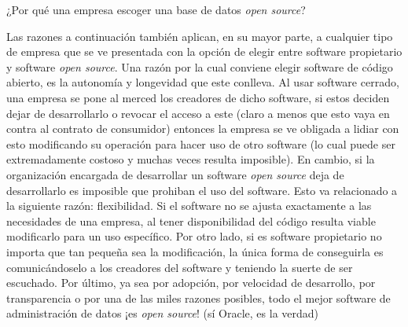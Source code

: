 \item ¿Por qué una empresa escoger una base de datos \textit{open source}?

  Las razones a continuación también aplican, en su mayor parte, a cualquier tipo de empresa que se ve presentada con la opción de elegir entre software propietario y software \textit{open source}. Una razón por la cual conviene elegir software de código abierto, es la autonomía y longevidad que este conlleva. Al usar software cerrado, una empresa se pone al merced los creadores de dicho software, si estos deciden dejar de desarrollarlo o revocar el acceso a este (claro a menos que esto vaya en contra al contrato de consumidor) entonces la empresa se ve obligada a lidiar con esto modificando su operación para hacer uso de otro software (lo cual puede ser extremadamente costoso y muchas veces resulta imposible). En cambio, si la organización encargada de desarrollar un software \textit{open source} deja de desarrollarlo es imposible que prohiban el uso del software. Esto va relacionado a la siguiente razón: flexibilidad. Si el software no se ajusta exactamente a las necesidades de una empresa, al tener disponibilidad del código resulta viable modificarlo para un uso específico. Por otro lado, si es software propietario no importa que tan pequeña sea la modificación, la única forma de conseguirla es comunicándoselo a los creadores del software y teniendo la suerte de ser escuchado. Por último, ya sea por adopción, por velocidad de desarrollo, por transparencia o por una de las miles razones posibles, todo el mejor software de administración de datos ¡es \textit{open source}! (sí Oracle, es la verdad)
